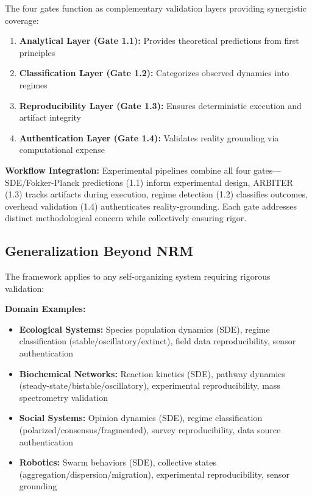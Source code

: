 \documentclass[11pt]{article}
\begin{document}
The four gates function as complementary validation layers providing synergistic coverage:

\begin{enumerate}
\item \textbf{Analytical Layer (Gate 1.1):} Provides theoretical predictions from first principles
\item \textbf{Classification Layer (Gate 1.2):} Categorizes observed dynamics into regimes
\item \textbf{Reproducibility Layer (Gate 1.3):} Ensures deterministic execution and artifact integrity
\item \textbf{Authentication Layer (Gate 1.4):} Validates reality grounding via computational expense
\end{enumerate}

\textbf{Workflow Integration:} Experimental pipelines combine all four gates—SDE/Fokker-Planck predictions (1.1) inform experimental design, ARBITER (1.3) tracks artifacts during execution, regime detection (1.2) classifies outcomes, overhead validation (1.4) authenticates reality-grounding. Each gate addresses distinct methodological concern while collectively ensuring rigor.

\subsection{Generalization Beyond NRM}

The framework applies to any self-organizing system requiring rigorous validation:

\textbf{Domain Examples:}
\begin{itemize}
\item \textbf{Ecological Systems:} Species population dynamics (SDE), regime classification (stable/oscillatory/extinct), field data reproducibility, sensor authentication
\item \textbf{Biochemical Networks:} Reaction kinetics (SDE), pathway dynamics (steady-state/bistable/oscillatory), experimental reproducibility, mass spectrometry validation
\item \textbf{Social Systems:} Opinion dynamics (SDE), regime classification (polarized/consensus/fragmented), survey reproducibility, data source authentication
\item \textbf{Robotics:} Swarm behaviors (SDE), collective states (aggregation/dispersion/migration), experimental reproducibility, sensor grounding
\end{itemize}
\end{document}
